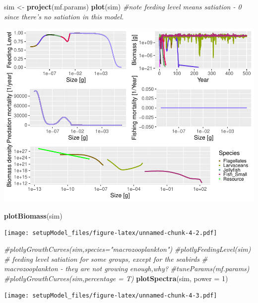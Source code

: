 \documentclass[
]{article}
\newenvironment{Shaded}{\begin{snugshade}}{\end{snugshade}}
\newcommand{\CommentTok}[1]{\textcolor[rgb]{0.56,0.35,0.01}{\textit{#1}}}
\newcommand{\DataTypeTok}[1]{\textcolor[rgb]{0.13,0.29,0.53}{#1}}
\newcommand{\DecValTok}[1]{\textcolor[rgb]{0.00,0.00,0.81}{#1}}
\newcommand{\KeywordTok}[1]{\textcolor[rgb]{0.13,0.29,0.53}{\textbf{#1}}}
\newcommand{\NormalTok}[1]{#1}
\newcommand{\StringTok}[1]{\textcolor[rgb]{0.31,0.60,0.02}{#1}}
\begin{document}
\begin{Shaded}
\begin{Highlighting}[]
\NormalTok{sim <-}\StringTok{ }\KeywordTok{project}\NormalTok{(mf.params)}
\KeywordTok{plot}\NormalTok{(sim) }\CommentTok{#note feeding level means satiation - 0 since there's no satiation in this model.}
\end{Highlighting}
\end{Shaded}

\includegraphics{setupModel_files/figure-latex/unnamed-chunk-4-1.pdf}

\begin{Shaded}
\begin{Highlighting}[]
\KeywordTok{plotBiomass}\NormalTok{(sim)}
\end{Highlighting}
\end{Shaded}

\texttt{[image: setupModel\_files/figure-latex/unnamed-chunk-4-2.pdf]}

\begin{Shaded}
\begin{Highlighting}[]
\CommentTok{#plotlyGrowthCurves(sim,species="macrozooplankton")}
\CommentTok{#plotlyFeedingLevel(sim)}
\CommentTok{# feeding level satiation for some groups, except for the seabirds}
\CommentTok{# macrozooplankton - they are not growing enough,why?}
\CommentTok{#tuneParams(mf.params)}
\CommentTok{#plotlyGrowthCurves(sim,percentage = T)}
\KeywordTok{plotSpectra}\NormalTok{(sim, }\DataTypeTok{power =} \DecValTok{1}\NormalTok{)}
\end{Highlighting}
\end{Shaded}

\texttt{[image: setupModel\_files/figure-latex/unnamed-chunk-4-3.pdf]}
\end{document}
